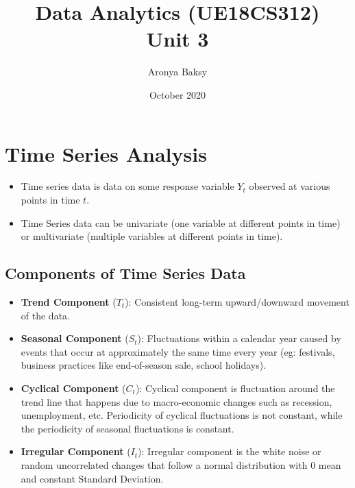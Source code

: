 \documentclass{article}
\title{Data Analytics (UE18CS312)\\
\large Unit 3}
\author{Aronya Baksy}
\date{October 2020}
\theoremstyle{plain}
\theoremstyle{definition}
\begin{document}
\maketitle

\section{Time Series Analysis}
\begin{itemize}
    \item Time series data is data on some response variable $Y_t$ observed at various points in time $t$. 
    
    \item Time Series data can be univariate (one variable at different points in time) or multivariate (multiple variables at different points in time). 
\end{itemize}

\subsection{Components of Time Series Data}
\begin{itemize}
    \item \textbf{Trend Component} ($T_t$): Consistent long-term upward/downward movement of the data.
    
    \item \textbf{Seasonal Component} ($S_t$): Fluctuations within a calendar year caused by events that occur at approximately the same time every year (eg: festivals, business practices like end-of-season sale, school holidays). 
    
    \item \textbf{Cyclical Component} ($C_t$): Cyclical component is fluctuation around the trend line that happens due to macro-economic changes such as recession, unemployment, etc. Periodicity of  cyclical fluctuations is not constant, while the periodicity of seasonal fluctuations is constant. 
    
    \item \textbf{Irregular Component} ($I_t$): Irregular component is the white noise or random uncorrelated changes that follow a normal distribution with 0 mean and constant Standard Deviation.
\end{itemize}
\end{document}
